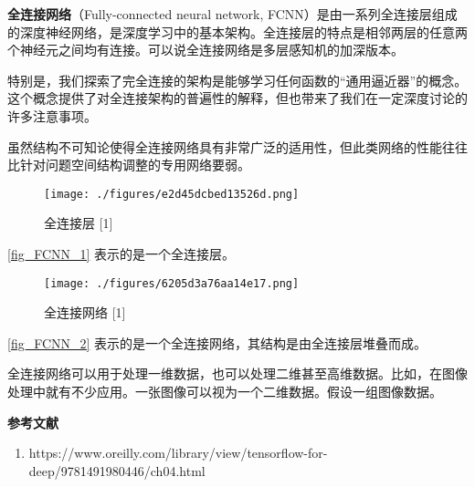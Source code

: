 



\textbf{全连接网络}（Fully-connected neural network, FCNN）是由一系列全连接层组成的深度神经网络，是深度学习中的基本架构。全连接层的特点是相邻两层的任意两个神经元之间均有连接。可以说全连接网络是多层感知机的加深版本。

特别是，我们探索了完全连接的架构是能够学习任何函数的“通用逼近器”的概念。这个概念提供了对全连接架构的普遍性的解释，但也带来了我们在一定深度讨论的许多注意事项。

虽然结构不可知论使得全连接网络具有非常广泛的适用性，但此类网络的性能往往比针对问题空间结构调整的专用网络要弱。

\begin{figure}[ht]
\centering
\texttt{[image: ./figures/e2d45dcbed13526d.png]}
\caption{全连接层 [1]} \label{fig_FCNN_1}
\end{figure}
\autoref{fig_FCNN_1} 表示的是一个全连接层。

\begin{figure}[ht]
\centering
\texttt{[image: ./figures/6205d3a76aa14e17.png]}
\caption{全连接网络 [1]} \label{fig_FCNN_2}
\end{figure}
\autoref{fig_FCNN_2} 表示的是一个全连接网络，其结构是由全连接层堆叠而成。

全连接网络可以用于处理一维数据，也可以处理二维甚至高维数据。比如，在图像处理中就有不少应用。一张图像可以视为一个二维数据。假设一组图像数据。



\textbf{参考文献}
\begin{enumerate}
\item https://www.oreilly.com/library/view/tensorflow-for-deep/9781491980446/ch04.html
\end{enumerate}